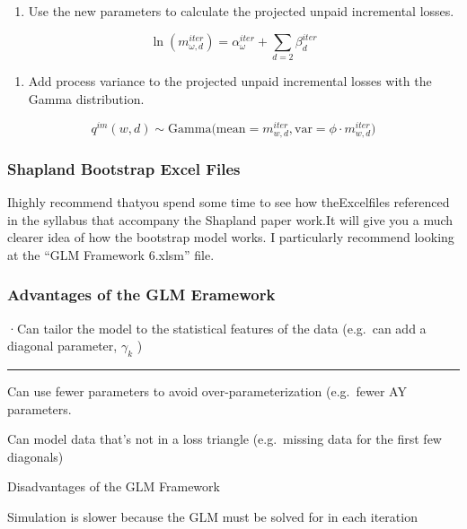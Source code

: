 \documentclass[
]{article}
\providecommand{\tightlist}{%
  \setlength{\itemsep}{0pt}\setlength{\parskip}{0pt}}
\begin{document}
\begin{enumerate}
\def\labelenumi{\arabic{enumi}.}
\setcounter{enumi}{9}
\tightlist
\item
  Use the new parameters to calculate the projected unpaid incremental
  losses.
\end{enumerate}

\[\ln\left(m_{\omega,d}^{iter}\right)=\alpha_{\omega}^{iter}+\sum_{d=2}\beta_{d}^{iter}\]

\begin{enumerate}
\def\labelenumi{\arabic{enumi}.}
\setcounter{enumi}{10}
\tightlist
\item
  Add process variance to the projected unpaid incremental losses with
  the Gamma distribution.
\end{enumerate}

\[q^{im}(w,d)\sim\mathrm{Gamma}\Big(\mathrm{mean}=m_{w,d}^{iter},\mathrm{var}=\phi\cdot m_{w,d}^{iter}\Big)\]

\subsubsection{Shapland Bootstrap Excel
Files}\label{shapland-bootstrap-excel-files}

Ihighly recommend thatyou spend some time to see how theExcelfiles
referenced in the syllabus that accompany the Shapland paper work.It
will give you a much clearer idea of how the bootstrap model works. I
particularly recommend looking at the ``GLM Framework 6.xlsm'' file.

\subsubsection{Advantages of the GLM
Eramework}\label{advantages-of-the-glm-eramework}

·Can tailor the model to the statistical features of the data (e.g.~can
add a diagonal parameter, \(\gamma_{k}\) )

\begin{center}\rule{0.5\linewidth}{0.5pt}\end{center}

Can use fewer parameters to avoid over-parameterization (e.g.~fewer AY
parameters.

Can model data that's not in a loss triangle (e.g.~missing data for the
first few diagonals)

Disadvantages of the GLM Framework

Simulation is slower because the GLM must be solved for in each
iteration
\end{document}

